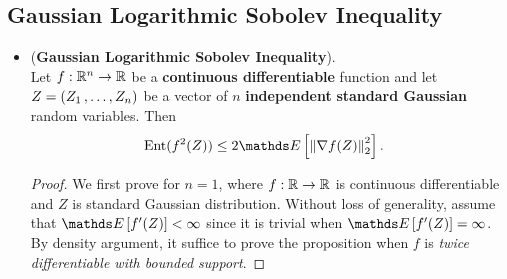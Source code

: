 \documentclass[11pt]{article}
\begin{document}
\subsection{Gaussian Logarithmic Sobolev Inequality}
\begin{itemize}
\item \begin{theorem} (\textbf{Gaussian Logarithmic Sobolev Inequality}). \citep{boucheron2013concentration}\\
Let $f: {\mathbb R}^n \to {\mathbb R}$ be a \textbf{continuous differentiable} function and let $Z = (Z_1 \,{,}\ldots{,}\, Z_n)$ be a vector of $n$ \textbf{independent} \textbf{standard Gaussian} random variables. Then
\begin{align}
\text{Ent}(f^2(Z)) &\le 2\E{}{\norm{\nabla f(Z)}{2}^2}.  \label{ineqn: log_sobolev_inequality_gaussian}
\end{align}
\end{theorem}
\begin{proof}
We first prove for $n=1$, where $f: {\mathbb R} \rightarrow {\mathbb R}$ is continuous differentiable and $Z$ is standard Gaussian distribution. Without loss of generality, assume that $\E{}{f'(Z)} < \infty$ since it is trivial when  $\E{}{f'(Z)} = \infty$. By density argument, it suffice to prove the proposition when $f$ is \emph{twice differentiable with bounded support}.


\end{proof}
\end{itemize}
\end{document}

